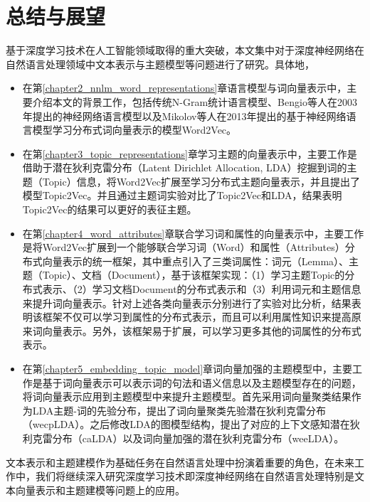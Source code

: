 \documentclass[master]{njuthesis}
\begin{document}
\chapter{总结与展望}\label{chapter6_concludes}

基于深度学习技术在人工智能领域取得的重大突破，本文集中对于深度神经网络在自然语言处理领域中文本表示与主题模型等问题进行了研究。具体地，
\begin{itemize}
\item 在第\ref{chapter2_nnlm_word_representations}章语言模型与词向量表示中，主要介绍本文的背景工作，包括传统N-Gram统计语言模型、Bengio等人在2003年提出的神经网络语言模型\cite{bengio2003neural}以及Mikolov等人在2013年提出的基于神经网络语言模型学习分布式词向量表示的模型Word2Vec\cite{mikolov2013efficient,mikolov2013distributed,mikolov2013linguistic}。
\item 在第\ref{chapter3_topic_representations}章学习主题的向量表示中，主要工作是借助于潜在狄利克雷分布（Latent Dirichlet Allocation, LDA）挖掘到词的主题（Topic）信息，将Word2Vec扩展至学习分布式主题向量表示，并且提出了模型Topic2Vec。并且通过主题词实验对比了Topic2Vec和LDA，结果表明Topic2Vec的结果可以更好的表征主题。
\item 在第\ref{chapter4_word_attributes}章联合学习词和属性的向量表示中，主要工作是将Word2Vec扩展到一个能够联合学习词（Word）和属性（Attributes）分布式向量表示的统一框架，其中重点引入了三类词属性：词元（Lemma）、主题（Topic）、文档（Document），基于该框架实现：（1）学习主题Topic的分布式表示、（2）学习文档Document的分布式表示和（3）利用词元和主题信息来提升词向量表示。针对上述各类向量表示分别进行了实验对比分析，结果表明该框架不仅可以学习到属性的分布式表示，而且可以利用属性知识来提高原来词向量表示。另外，该框架易于扩展，可以学习更多其他的词属性的分布式表示。
\item 在第\ref{chapter5_embedding_topic_model}章词向量加强的主题模型中，主要工作是基于词向量表示可以表示词的句法和语义信息以及主题模型存在的问题，将词向量表示应用到主题模型中来提升主题模型。首先采用词向量聚类结果作为LDA主题-词的先验分布，提出了词向量聚类先验潜在狄利克雷分布（wecpLDA）。之后修改LDA的图模型结构，提出了对应的上下文感知潜在狄利克雷分布（caLDA）以及词向量加强的潜在狄利克雷分布（weeLDA）。
\end{itemize}

文本表示和主题建模作为基础任务在自然语言处理中扮演着重要的角色，在未来工作中，我们将继续深入研究深度学习技术即深度神经网络在自然语言处理特别是文本向量表示和主题建模等问题上的应用。
\end{document}
